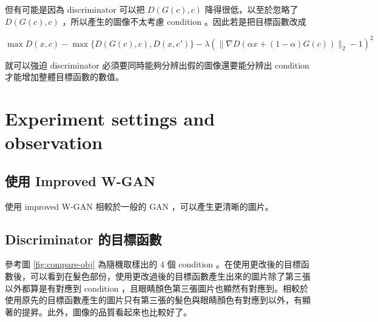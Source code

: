 \documentclass[fleqn,a4paper,12pt]{article}
\begin{document}
但有可能是因為 discriminator 可以把 $D(G(c), c)$ 降得很低，以至於忽略了 $D(G(c), c)$ ，所以產生的圖像不太考慮 condition 。因此若是把目標函數改成

\begin{equation*}
  \max D(x, c) -\max\{D(G(c), c), D(x, c')\} - \lambda (\lVert \nabla D(\alpha x + (1 - \alpha) G(c)) \rVert_2 - 1)^2
\end{equation*}

就可以強迫 discriminator 必須要同時能夠分辨出假的圖像還要能分辨出 condition 才能增加整體目標函數的數值。

\section{Experiment settings and observation}

\subsection{使用 Improved W-GAN}

使用 improved W-GAN 相較於一般的 GAN ，可以產生更清晰的圖片。

\subsection{Discriminator 的目標函數}

參考圖 \ref{fig:compare-obj} 為隨機取樣出的 4 個 condition 。在使用更改後的目標函數後，可以看到在髮色部份，使用更改過後的目標函數產生出來的圖片除了第三張以外都算是有對應到 condition ，且眼睛顏色第三張圖片也顯然有對應到。相較於使用原先的目標函數產生的圖片只有第三張的髮色與眼睛顏色有對應到以外，有顯著的提昇。此外，圖像的品質看起來也比較好了。
\end{document}
